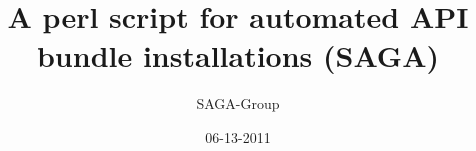 \documentclass[a4paper,10pt]{article}
\newcommand{\jhanote}[1]{  {\textcolor{red}     { ***Shantenu: #1 }}}
\newcommand{\jhanote}[1]{}
\begin{document}
 \title{ \Large \vspace{-3.5em} A perl script for automated API bundle installations (SAGA)}
 
 \author{\normalsize SAGA-Group}
 \date{\normalsize 06-13-2011}
 \maketitle
 




\end{document}
